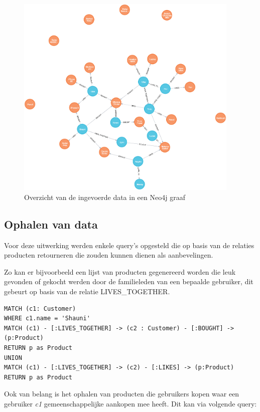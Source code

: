 \begin{figure} [h!]
	\centering
	\includegraphics[width=0.95\textwidth]{img/full_graph_result}
	\caption{Overzicht van de ingevoerde data in een Neo4j graaf}
	\label{fig:neo4jfullgraph}
\end{figure}


\subsection{Ophalen van data}
\label{sec:Neo4j Ophalen van data}

Voor deze uitwerking werden enkele query's opgesteld die op basis van de relaties producten retourneren die zouden kunnen dienen als aanbevelingen.

Zo kan er bijvoorbeeld een lijst van producten gegenereerd worden die leuk gevonden of gekocht werden door de familieleden van een bepaalde gebruiker, dit gebeurt op basis van de relatie LIVES\_TOGETHER.

\begin{lstlisting}[caption={Neo4j query die alle likes en aankopen van de familie van een bepaalde gebruiker c1 weergeeft}]
MATCH (c1: Customer)
WHERE c1.name = 'Shauni'
MATCH (c1) - [:LIVES_TOGETHER] -> (c2 : Customer) - [:BOUGHT] -> (p:Product)
RETURN p as Product
UNION
MATCH (c1) - [:LIVES_TOGETHER] -> (c2) - [:LIKES] -> (p:Product)
RETURN p as Product
\end{lstlisting}

Ook van belang is het ophalen van producten die gebruikers kopen waar een gebruiker \textit{c1} gemeenschappelijke aankopen mee heeft. Dit kan via volgende query:

